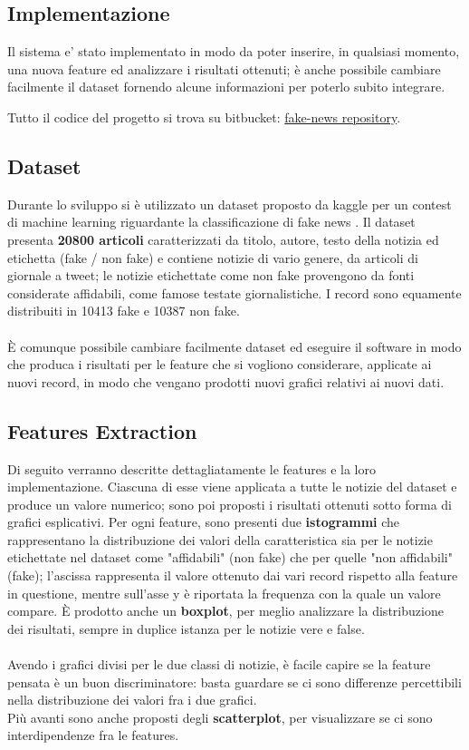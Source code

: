 \documentclass{article}
\begin{document}
\begin{multicols}{2}
		    
	    \section{Implementazione}
		    Il sistema e' stato implementato in modo da poter inserire, in qualsiasi momento, una nuova feature ed analizzare i risultati ottenuti; è anche possibile cambiare facilmente il dataset fornendo alcune informazioni per poterlo subito integrare.
		    
		    Tutto il codice del progetto si trova su bitbucket: 
		    \href{https://bitbucket.org/IcedGarion/fake-news}{fake-news repository}. 
		    
			\subsection{Dataset}
			Durante lo sviluppo si è utilizzato un dataset proposto da kaggle per un contest di machine learning riguardante la classificazione di fake news \cite{kaggledataset}. Il dataset presenta \textbf{20800 articoli} caratterizzati da titolo, autore, testo della notizia ed etichetta (fake / non fake) e contiene notizie di vario genere, da articoli di giornale a tweet; le notizie etichettate come non fake provengono da fonti considerate affidabili, come famose testate giornalistiche. I record sono equamente distribuiti in 10413 fake e 10387 non fake.
			\\~\\
			È comunque possibile cambiare facilmente dataset ed eseguire il software in modo che produca i risultati per le feature che si vogliono considerare, applicate ai nuovi record, in modo che vengano prodotti nuovi grafici relativi ai nuovi dati.
			
			
			\subsection{Features Extraction}
			Di seguito verranno descritte dettagliatamente le features e la loro implementazione.
			Ciascuna di esse viene applicata a tutte le notizie del dataset e produce un valore numerico; sono poi proposti i risultati ottenuti sotto forma di grafici esplicativi. Per ogni feature, sono presenti due \textbf{istogrammi} che rappresentano la distribuzione dei valori della caratteristica sia per le notizie etichettate nel dataset come "affidabili" (non fake) che per quelle "non affidabili" (fake); l'ascissa rappresenta il valore ottenuto dai vari record rispetto alla feature in questione, mentre sull'asse y è riportata la frequenza con la quale un valore compare. È prodotto anche un \textbf{boxplot}, per meglio analizzare la distribuzione dei risultati, sempre in duplice istanza per le notizie vere e false.\\~\\
			Avendo i grafici divisi per le due classi di notizie, è facile capire se la feature pensata è un buon discriminatore: basta guardare se ci sono differenze percettibili nella distribuzione dei valori fra i due grafici.\\
			Più avanti sono anche proposti degli \textbf{scatterplot}, per visualizzare se ci sono interdipendenze fra le features.
			

\end{multicols}
\end{document}
